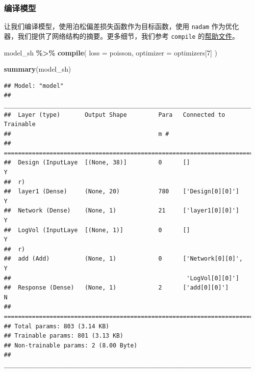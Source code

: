 \documentclass[
]{article}
\newenvironment{Shaded}{\begin{snugshade}}{\end{snugshade}}
\newcommand{\AttributeTok}[1]{\textcolor[rgb]{0.13,0.29,0.53}{#1}}
\newcommand{\DecValTok}[1]{\textcolor[rgb]{0.00,0.00,0.81}{#1}}
\newcommand{\FunctionTok}[1]{\textcolor[rgb]{0.13,0.29,0.53}{\textbf{#1}}}
\newcommand{\NormalTok}[1]{#1}
\newcommand{\SpecialCharTok}[1]{\textcolor[rgb]{0.81,0.36,0.00}{\textbf{#1}}}
\newcommand{\StringTok}[1]{\textcolor[rgb]{0.31,0.60,0.02}{#1}}
\begin{document}
\subsubsection{编译模型}\label{ux7f16ux8bd1ux6a21ux578b}

让我们编译模型，使用泊松偏差损失函数作为目标函数，使用 \texttt{nadam}
作为优化器，我们提供了网络结构的摘要。更多细节，我们参考
\texttt{compile}
的\href{https://keras.rstudio.com/reference/compile.html}{帮助文件}。

\begin{Shaded}
\begin{Highlighting}[]
\NormalTok{model\_sh }\SpecialCharTok{\%\textgreater{}\%} \FunctionTok{compile}\NormalTok{(}
  \AttributeTok{loss =} \StringTok{\textquotesingle{}poisson\textquotesingle{}}\NormalTok{,}
  \AttributeTok{optimizer =}\NormalTok{ optimizers[}\DecValTok{7}\NormalTok{]}
\NormalTok{)}

\FunctionTok{summary}\NormalTok{(model\_sh)}
\end{Highlighting}
\end{Shaded}

\begin{verbatim}
## Model: "model"
## ________________________________________________________________________________
##  Layer (type)       Output Shape         Para   Connected to         Trainable  
##                                          m #                                    
## ================================================================================
##  Design (InputLaye  [(None, 38)]         0      []                   Y          
##  r)                                                                             
##  layer1 (Dense)     (None, 20)           780    ['Design[0][0]']     Y          
##  Network (Dense)    (None, 1)            21     ['layer1[0][0]']     Y          
##  LogVol (InputLaye  [(None, 1)]          0      []                   Y          
##  r)                                                                             
##  add (Add)          (None, 1)            0      ['Network[0][0]',    Y          
##                                                  'LogVol[0][0]']                
##  Response (Dense)   (None, 1)            2      ['add[0][0]']        N          
## ================================================================================
## Total params: 803 (3.14 KB)
## Trainable params: 801 (3.13 KB)
## Non-trainable params: 2 (8.00 Byte)
## ________________________________________________________________________________
\end{verbatim}
\end{document}
